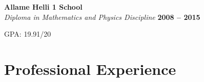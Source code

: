 \documentclass[line, mm]{sampleCV}
\begin{document}
\begin{resume}
\begin{list2}
\begin{list2}
       	\iffalse
			item Selected courses (out of 20): 
			\begin{list2}
			\item Internet Engineering: 20			
			\item Network Security: 20
			\item Introduction to Cryptocurrency: 20
			\item Software Engineering: 19.2
			\item Software Testing: 19.1
			\item Advanced Software Design: 18.33
			\item Design and Analysis of Algorithms: 19.1    
			\item Formal Methods in Software Engineering: 18.6
			\item Compiler Design and Implementation: 18.5
			\item Theory of Formal Languages and Automata: 19.25
			\end{list2}
	\fi
    \end{list2}


\item \textbf{Allame Helli 1 School} \vspace{2mm}\\\vspace{1mm}
\textsl{Diploma in Mathematics and Physics Discipline} \hfill \textbf{ 2008 -- 2015}%
 \begin{list2}
	\item GPA: 19.91/20 \
	\end{list2}
\end{list2}
	
\section{\mysidestyle Professional Experience}

\begin{list2}


\end{list2}
\end{resume}
\end{document}
